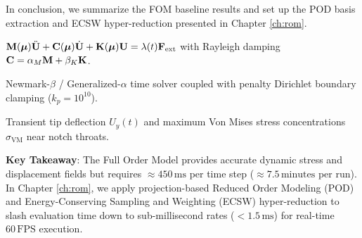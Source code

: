 In conclusion, we summarize the FOM baseline results and set up the POD basis extraction and ECSW hyper-reduction presented in Chapter \ref{ch:rom}.

\begin{tcolorbox}[colback=lightbg, colframe=primaryblue, title=\textbf{Chapter Summary: Full Order Model (FOM) Dynamics}, fonttitle=\bfseries]
    \begin{description}[leftmargin=!, labelwidth=3.4cm]
        \item[\textbf{Governing System}] $\mathbf{M}(\boldsymbol{\mu})\ddot{\mathbf{U}} + \mathbf{C}(\boldsymbol{\mu})\dot{\mathbf{U}} + \mathbf{K}(\boldsymbol{\mu})\mathbf{U} = \lambda(t)\mathbf{F}_{\text{ext}}$ with Rayleigh damping $\mathbf{C} = \alpha_M \mathbf{M} + \beta_K \mathbf{K}$.
        \item[\textbf{Implicit Integration}] Newmark-$\beta$ / Generalized-$\alpha$ time solver coupled with penalty Dirichlet boundary clamping ($k_p = 10^{10}$).
        \item[\textbf{Physical QoIs}] Transient tip deflection $U_y(t)$ and maximum Von Mises stress concentrations $\sigma_{\text{VM}}$ near notch throats.
    \end{description}
    
    \vspace{0.2cm}
    \textbf{Key Takeaway}: The Full Order Model provides accurate dynamic stress and displacement fields but requires $\approx 450\,\text{ms}$ per time step ($\approx 7.5\,\text{minutes}$ per run). In Chapter \ref{ch:rom}, we apply projection-based Reduced Order Modeling (POD) and Energy-Conserving Sampling and Weighting (ECSW) hyper-reduction to slash evaluation time down to sub-millisecond rates ($<1.5\,\text{ms}$) for real-time $60\,\text{FPS}$ execution.
\end{tcolorbox}
